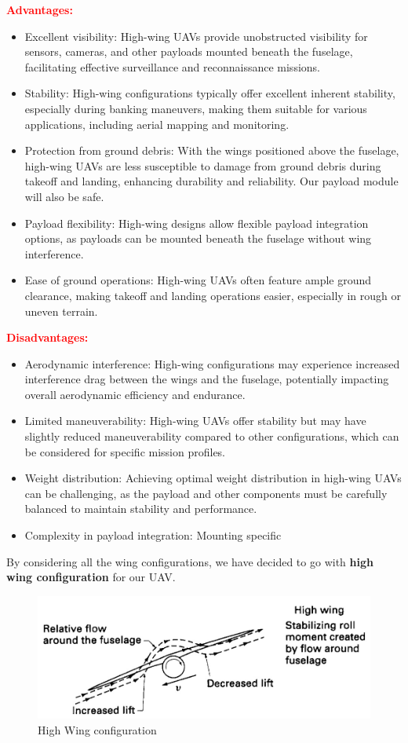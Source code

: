 \documentclass[12 pt]{article}
\begin{document}
{\color{black}
\textbf{\textcolor{red}{Advantages:}}
\begin{itemize}
  \item Excellent visibility: High-wing UAVs provide unobstructed visibility for sensors, cameras, and other payloads mounted beneath the fuselage, facilitating effective surveillance and reconnaissance missions.
  \item Stability: High-wing configurations typically offer excellent inherent stability, especially during banking maneuvers, making them suitable for various applications, including aerial mapping and monitoring.
  \item Protection from ground debris: With the wings positioned above the fuselage, high-wing UAVs are less susceptible to damage from ground debris during takeoff and landing, enhancing durability and reliability. Our payload module will also be safe.
  \item Payload flexibility: High-wing designs allow flexible payload integration options, as payloads can be mounted beneath the fuselage without wing interference.
  \item Ease of ground operations: High-wing UAVs often feature ample ground clearance, making takeoff and landing operations easier, especially in rough or uneven terrain.
\end{itemize}

\textbf{\textcolor{red}{Disadvantages:}}
\begin{itemize}
  \item Aerodynamic interference: High-wing configurations may experience increased interference drag between the wings and the fuselage, potentially impacting overall aerodynamic efficiency and endurance.
  \item Limited maneuverability: High-wing UAVs offer stability but may have slightly reduced maneuverability compared to other configurations, which can be considered for specific mission profiles.
  \item Weight distribution: Achieving optimal weight distribution in high-wing UAVs can be challenging, as the payload and other components must be carefully balanced to maintain stability and performance.
  \item Complexity in payload integration: Mounting specific
\end{itemize}
\vspace{5mm} 
By considering all the wing configurations, we have decided to go with\textbf{ high wing configuration} for our UAV.
\begin{figure}[H]
    \centering
    \includegraphics[width=\linewidth]{Codes/Week 6/wing configuration.jpeg}
    \caption{High Wing configuration}
    \label{High Wing configuration}
\end{figure}
\color{red}
}
\end{document}

